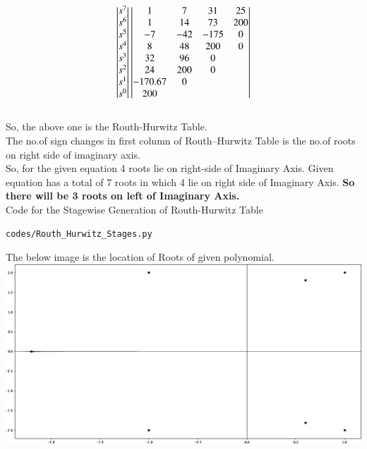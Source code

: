 \begin{align}
\begin{vmatrix}s^7\\s^6\\s^5\\s^4\\s^3\\s^2\\s^1\\s^0\end{vmatrix}
\begin{vmatrix}1 & 7 & 31 & 25 \\ 1 & 14 & 73 & 200 \\ -7 & -42 & -175 & 0 \\ 8 & 48 & 200 & 0 \\ 32 & 96 & 0 &  \\ 24 & 200 & 0 &  \\ -170.67 & 0 &  & \\200 &   &   & \end{vmatrix}
\end{align}\\

So, the above one is the Routh-Hurwitz Table.\\
The no.of sign changes in first column of Routh–Hurwitz Table is the no.of roots on right side of imaginary axis.\\
So, for the given equation 4 roots lie on right-side of Imaginary Axis.
Given equation has a total of 7 roots in which 4 lie on right side of Imaginary Axis. \textbf{So there will be 3 roots on left of Imaginary Axis.}\\

Code for the Stagewise Generation of Routh-Hurwitz Table
\begin{lstlisting}
codes/Routh_Hurwitz_Stages.py
\end{lstlisting}

The below image is the location of Roots of given polynomial.\\
\includegraphics[scale=0.15]{figs/Roots.eps}\\

